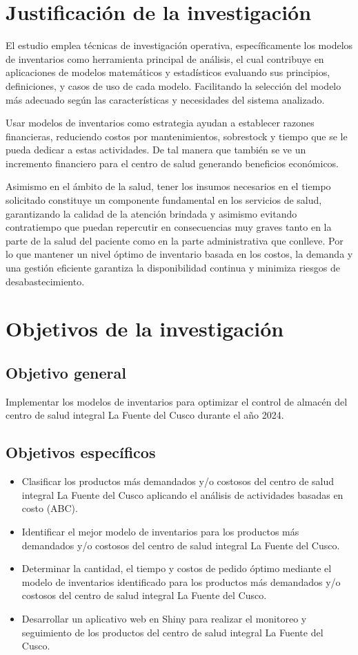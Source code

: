 \section{Justificación de la investigación}
El estudio emplea técnicas de investigación operativa, específicamente los modelos de inventarios como herramienta principal de análisis, el cual contribuye en aplicaciones de modelos matemáticos y estadísticos evaluando sus principios, definiciones, y casos de uso de cada modelo. Facilitando la selección del modelo más adecuado según las características y necesidades del sistema analizado.

Usar modelos de inventarios como estrategia ayudan a establecer razones financieras, reduciendo costos por mantenimientos, sobrestock y tiempo que se le pueda dedicar a estas actividades. De tal manera que también se ve un incremento financiero para el centro de salud generando beneficios económicos.

Asimismo en el ámbito de la salud, tener los insumos necesarios en el tiempo solicitado constituye un componente fundamental en los servicios de salud, garantizando la calidad de la atención brindada y asimismo evitando contratiempo que puedan repercutir en consecuencias muy graves tanto en la parte de la salud del paciente como en la parte administrativa que conlleve. Por lo que mantener un nivel óptimo de inventario basada en los costos, la demanda y una gestión eficiente garantiza la disponibilidad continua y minimiza riesgos de desabastecimiento.
\newpage
\section{Objetivos de la investigación}
\subsection{Objetivo general}
Implementar los modelos de inventarios para optimizar el control de almacén del centro de salud integral La Fuente del Cusco durante el año 2024.
\subsection{Objetivos específicos}
\begin{itemize}
	\item Clasificar los productos más demandados y/o costosos del centro de salud integral La Fuente del Cusco aplicando el análisis de actividades basadas en costo (ABC).
	\item Identificar el mejor modelo de inventarios para los productos más demandados y/o costosos del centro de salud integral La Fuente del Cusco.
	\item Determinar la cantidad, el tiempo y costos de pedido óptimo mediante el modelo de inventarios identificado para los productos más demandados y/o costosos del centro de salud integral La Fuente del Cusco.
	\item Desarrollar un aplicativo web en Shiny para realizar el monitoreo y seguimiento de los productos del centro de salud integral La Fuente del Cusco.
\end{itemize}
